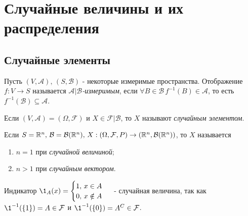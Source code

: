 \section{Случайные величины и их распределения}

\subsection{Случайные элементы}
\begin{definition}\label{lect05:def1}
	Пусть $(V, \mathcal{A}), \,(S, \mathcal{B})$ - некоторые измеримые пространства. Отображение $f: V \to S$ называется \textit{$\mathcal{A} | \mathcal{B}$-измеримым}, если $\forall B \in \mathcal{B} \, f^{-1}(B) \in \mathcal{A}$, то есть $f^{-1}(\mathcal{B}) \subseteq \mathcal{A}$.
	
	Если  $(V, \mathcal{A}) = (\Omega, \mathcal{F})$ и $X \in \mathcal{F}|\mathcal{B}$, то $X$ называют \textit{случайным элементом}.
	
	Если $S = \mathbb{R}^n, \, \mathcal{B} = \mathcal{B}(\mathbb{R}^n), \, X:(\Omega, \mathcal{F}, P) \to (\mathbb{R}^n, \mathcal{B}(\mathbb{R}^n))$, то $X$ называется 
	\begin{enumerate}
		\item $n = 1$ при \textit{случайной величиной};
		\item $n > 1$ при \textit{случайным вектором}.
	\end{enumerate}
\end{definition}

\begin{example}\label{lect05:ex1}
	Индикатор $\1_A(x) = 
	\begin{cases}
	1, \, x \in A\\
	0, \, x \notin A\\
	\end{cases}\,$ - случайная величина, так как $\1^{-1}(\{1\}) = A \in \mathcal{F}$ и  $\1^{-1}(\{0\}) = A^C \in \mathcal{F}$.        
\end{example}

